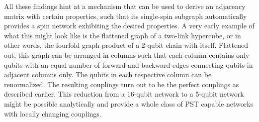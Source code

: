 \begin{center}
\end{center}

\noindent All these findings hint at a mechanism that can be used to derive an adjacency matrix with certain properties, such that its single-spin subgraph automatically provides a spin network exhibiting the desired properties. A very early example of what this might look like is the flattened graph of a two-link hypercube, or in other words, the fourfold graph product of a 2-qubit chain with itself. Flattened out, this graph can be arranged in columns such that each column contains only qubits with an equal number of forward and backward edges connecting qubits in adjacent columns only. The qubits in each respective column can be renormalized\cite{Christandl2005}. The resulting couplings turn out to be the perfect couplings as described earlier. This reduction from a 16-qubit network to a 5-qubit network might be possible analytically and provide a whole class of PST capable networks with locally changing couplings.





